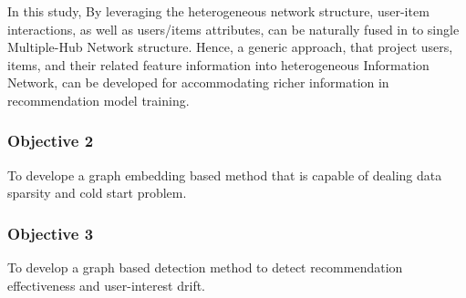 In this study, By leveraging the heterogeneous network structure, user-item interactions, as well as users/items attributes, can be naturally fused in to single Multiple-Hub Network \citep{Shi2017} structure. Hence, a generic approach, that project users, items, and their related feature information into heterogeneous Information Network, can be developed for accommodating richer information in recommendation model training.



\subsubsection*{Objective 2}
To develope a graph embedding based method that is capable of dealing data sparsity and cold start problem.




\subsubsection*{Objective 3}
To develop a graph based detection method to detect recommendation effectiveness and user-interest drift.



